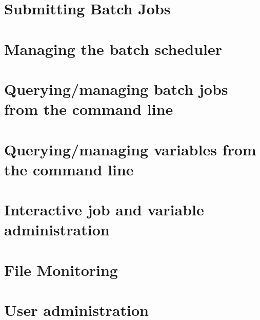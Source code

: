 \section{Submitting Batch Jobs}



\section{Managing the batch scheduler}








\section{Querying/managing batch jobs from the command line}






\section{Querying/managing variables from the command line}


\section{Interactive job and variable administration}


\section{File Monitoring}


\section{User administration}





